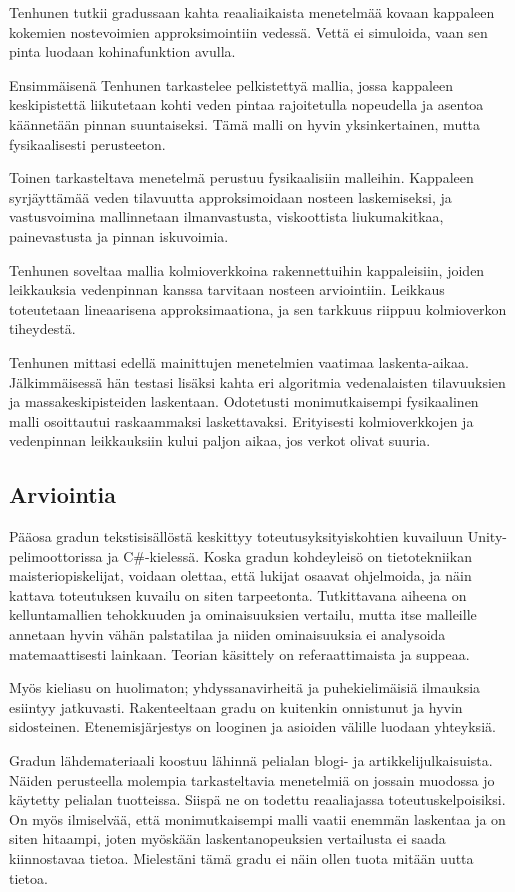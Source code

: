 \documentclass[utf8]{gradu3}
\begin{document}
Tenhunen tutkii gradussaan kahta reaaliaikaista menetelmää kovaan kappaleen
kokemien nostevoimien approksimointiin vedessä. Vettä ei simuloida, vaan sen
pinta luodaan kohinafunktion avulla.

Ensimmäisenä Tenhunen tarkastelee pelkistettyä mallia, jossa kappaleen
keskipistettä liikutetaan kohti veden pintaa rajoitetulla nopeudella ja asentoa
käännetään pinnan suuntaiseksi. Tämä malli on hyvin yksinkertainen, mutta
fysikaalisesti perusteeton.

Toinen tarkasteltava menetelmä perustuu fysikaalisiin malleihin. Kappaleen
syrjäyttämää veden tilavuutta approksimoidaan nosteen laskemiseksi, ja
vastusvoimina mallinnetaan ilmanvastusta, viskoottista liukumakitkaa,
painevastusta ja pinnan iskuvoimia.

Tenhunen soveltaa mallia kolmioverkkoina rakennettuihin kappaleisiin, joiden
leikkauksia vedenpinnan kanssa tarvitaan nosteen arviointiin. Leikkaus
toteutetaan lineaarisena approksimaationa, ja sen tarkkuus riippuu kolmioverkon
tiheydestä.

Tenhunen mittasi edellä mainittujen menetelmien vaatimaa laskenta-aikaa.
Jälkimmäisessä hän testasi lisäksi kahta eri algoritmia vedenalaisten
tilavuuksien ja massakeskipisteiden laskentaan. Odotetusti monimutkaisempi
fysikaalinen malli osoittautui raskaammaksi laskettavaksi. Erityisesti
kolmioverkkojen ja vedenpinnan leikkauksiin kului paljon aikaa, jos verkot
olivat suuria.

\subsection{Arviointia}

Pääosa gradun tekstisisällöstä keskittyy toteutusyksityiskohtien kuvailuun
Unity-pelimoottorissa ja C\#-kielessä. Koska gradun kohdeyleisö on tietotekniikan
maisteriopiskelijat, voidaan olettaa, että lukijat osaavat ohjelmoida, ja näin
kattava toteutuksen kuvailu on siten tarpeetonta. Tutkittavana aiheena on
kelluntamallien tehokkuuden ja ominaisuuksien vertailu, mutta itse malleille
annetaan hyvin vähän palstatilaa ja niiden ominaisuuksia ei analysoida
matemaattisesti lainkaan. Teorian käsittely on referaattimaista ja suppeaa.

Myös kieliasu on huolimaton; yhdyssanavirheitä ja puhekielimäisiä ilmauksia
esiintyy jatkuvasti. Rakenteeltaan gradu on kuitenkin onnistunut ja hyvin
sidosteinen. Etenemisjärjestys on looginen ja asioiden välille luodaan
yhteyksiä.

Gradun lähdemateriaali koostuu lähinnä pelialan blogi- ja artikkelijulkaisuista.
Näiden perusteella molempia tarkasteltavia menetelmiä on jossain muodossa jo
käytetty pelialan tuotteissa. Siispä ne on todettu reaaliajassa
toteutuskelpoisiksi. On myös ilmiselvää, että monimutkaisempi malli vaatii
enemmän laskentaa ja on siten hitaampi, joten myöskään laskentanopeuksien
vertailusta ei saada kiinnostavaa tietoa. Mielestäni tämä gradu ei näin ollen
tuota mitään uutta tietoa.
\end{document}
